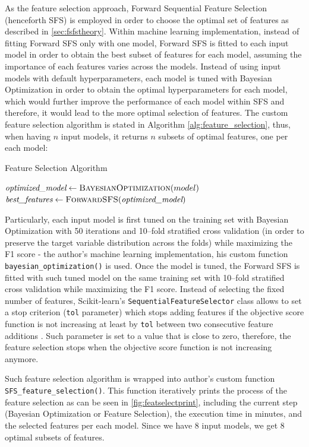 As the feature selection approach, Forward Sequential Feature Selection (henceforth SFS) is employed in order to choose the optimal set of features as described in \autoref{sec:fsfstheory}.
Within machine learning implementation, instead of fitting Forward SFS only with one model, Forward SFS is fitted to each input model in order to obtain the best subset of features for each model, assuming the importance of each features varies across the models.
Instead of using input models with default hyperparameters, each model is tuned with Bayesian Optimization in order to obtain the optimal hyperparameters for each model, which would further improve the performance of each model within SFS and therefore, it would lead to the more optimal selection of features.
The custom feature selection algorithm is stated in Algorithm \autoref{alg:feature_selection}, thus, when having $n$ input models, it returns $n$ subsets of optimal features, one per each model:
\begin{algorithm}[H]
\caption{Feature Selection Algorithm}
\label{alg:feature_selection}
\begin{algorithmic}[1]
    \State $\textit{optimized\_model} \gets \textsc{BayesianOptimization}(model)$
    \State $\textit{best\_features} \gets \textsc{ForwardSFS}(\textit{optimized\_model})$
\EndFor
\end{algorithmic}
\end{algorithm}
Particularly, each input model is first tuned on the training set with Bayesian Optimization with 50 iterations and 10--fold stratified cross validation (in order to preserve the target variable distribution across the folds) while maximizing the F1 score - the author's machine learning implementation, his custom function \lstinline{bayesian_optimization()} is used.
Once the model is tuned, the Forward SFS is fitted with such tuned model on the same training set with 10--fold stratified cross validation while maximizing the F1 score. Instead of selecting the fixed number of features, Scikit-learn's \lstinline{SequentialFeatureSelector} class allows to set a stop criterion (\lstinline{tol} parameter) which stops adding features if the objective score function is not increasing at least by \lstinline{tol} between two consecutive feature additions \citep{sfs}.
Such parameter is set to a value that is close to zero, therefore, the feature selection stops when the objective score function is not increasing anymore.

\newpage

Such feature selection algorithm is wrapped into author's custom function \lstinline{SFS_feature_selection()}.
This function iteratively prints the process of the feature selection as can be seen in \autoref{fig:featselectprint}, including the current step (Bayesian Optimization or Feature Selection), the execution time in minutes, and the selected features per each model. Since we have 8 input models, we get 8 optimal subsets of features.


